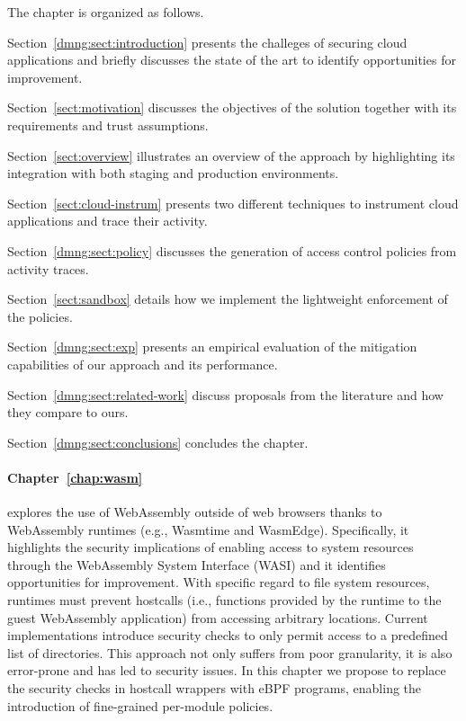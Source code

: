 \smallskip
\noindent The chapter is organized as follows.
\begin{compactitem}
    \item Section~\ref{dmng:sect:introduction} presents the challeges
     of securing cloud applications and briefly discusses the state of
     the art to identify opportunities for improvement.
    \item Section~\ref{sect:motivation} discusses the objectives of
     the solution together with its requirements and trust
     assumptions.
    \item Section~\ref{sect:overview} illustrates an overview of the
     approach by highlighting its integration with both staging and
     production environments.
    \item Section~\ref{sect:cloud-instrum} presents two different
     techniques to instrument cloud applications and trace their
     activity.
    \item Section~\ref{dmng:sect:policy} discusses the generation of
     access control policies from activity traces.
    \item Section~\ref{sect:sandbox} details how we implement the
     lightweight enforcement of the policies.
    \item Section~\ref{dmng:sect:exp} presents an empirical
     evaluation of the mitigation capabilities of our approach and
     its performance.
    \item Section~\ref{dmng:sect:related-work} discuss proposals from
     the literature and how they compare to ours.
    \item Section~\ref{dmng:sect:conclusions} concludes the chapter.
\end{compactitem}
\medskip

\paragraph*{Chapter~\ref{chap:wasm}} explores the use of WebAssembly
outside of web browsers thanks to WebAssembly runtimes (e.g., Wasmtime
and WasmEdge). Specifically, it highlights the security implications
of enabling access to system resources through the WebAssembly System
Interface (WASI) and it identifies opportunities for improvement. With
specific regard to file system resources, runtimes must prevent
hostcalls (i.e., functions provided by the runtime to the guest
WebAssembly application) from accessing arbitrary locations. Current
implementations introduce security checks to only permit access to a
predefined list of directories. This approach not only suffers from
poor granularity, it is also error-prone and has led to security
issues. In this chapter we propose to replace the security checks in
hostcall wrappers with eBPF programs, enabling the introduction of
fine-grained per-module policies.

